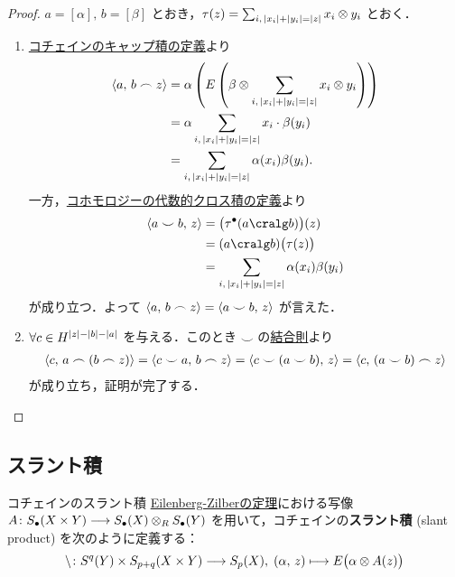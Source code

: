 \documentclass[algtopo_main]{subfiles}
\begin{document}
\begin{proof}
    $a = [\alpha],\, b = [\beta]$ とおき，$\tau(z) = \sum_{i,\, \abs{x_i} + \abs{y_i} = \abs{z}} x_i \otimes y_i$ とおく．
    \begin{enumerate}
        \item \hyperref[def:cap-cochain]{コチェインのキャップ積の定義}より
        \begin{align}
            \expval{a,\, b \frown z} &= \alpha \left( E\left( \beta \otimes \sum_{i,\, \abs{x_i} + \abs{y_i} = \abs{z}} x_i \otimes y_i \right) \right) \\
            &= \alpha  \sum_{i,\, \abs{x_i} + \abs{y_i} = \abs{z}} x_i \cdot \beta (y_i) \\
            &= \sum_{i,\, \abs{x_i} + \abs{y_i} = \abs{z}} \alpha (x_i) \beta(y_i).
        \end{align}
        一方，\hyperref[def:algcr-cohomology]{コホモロジーの代数的クロス積の定義}より
        \begin{align}
            \expval{a \smile b,\, z} &= \bigl(\tau^\bullet (a \cralg b)\bigr) (z) \\
            &= (a \cralg b)\bigl(\tau(z)\bigr) \\
            &= \sum_{i,\, \abs{x_i} + \abs{y_i} = \abs{z}} \alpha (x_i) \beta(y_i)
        \end{align}
        が成り立つ．よって $\expval{a,\, b \frown z} = \expval{a \smile b,\, z}$ が言えた．
        \item $\forall c \in H^{\abs{z} - \abs{b} - \abs{a}}$ を与える．このとき $\smile$ の\hyperref[thm:ring-cohomology]{結合則}より
        \begin{align}
            \expval{c,\, a \frown (b \frown z)} = \expval{c \smile a,\, b \frown z} = \expval{c \smile (a\smile b),\, z} = \expval{c,\, (a \smile b) \frown z}
        \end{align}
        が成り立ち，証明が完了する．
    \end{enumerate}
\end{proof}

\subsection{スラント積}

\begin{mydef}[label=def:slant-cochain]{コチェインのスラント積}
    \hyperref[thm:EZ]{Eilenberg-Zilberの定理}における写像 $A \colon S_\bullet (X \times Y) \longrightarrow S_\bullet (X) \otimes_R S_\bullet(Y)$ を用いて，コチェインの\textbf{スラント積} (slant product) を次のように定義する：
    \begin{align}
        \backslash \colon S^q(Y) \times S_{p+q} (X \times Y) \longrightarrow S_p(X),\; (\alpha,\, z) \longmapsto E \bigl( \alpha \otimes A(z) \bigr) 
    \end{align}
\end{mydef}
\end{document}
